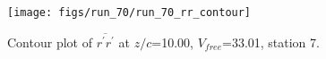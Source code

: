 \begin{figure}[H]
\centering
\texttt{[image: figs/run\_70/run\_70\_rr\_contour]}
\caption{Contour plot of $\overline{r^\prime r^\prime}$ at $z/c$=10.00, $V_{free}$=33.01, station 7.}
\label{fig:run_70_rr_contour}
\end{figure}


